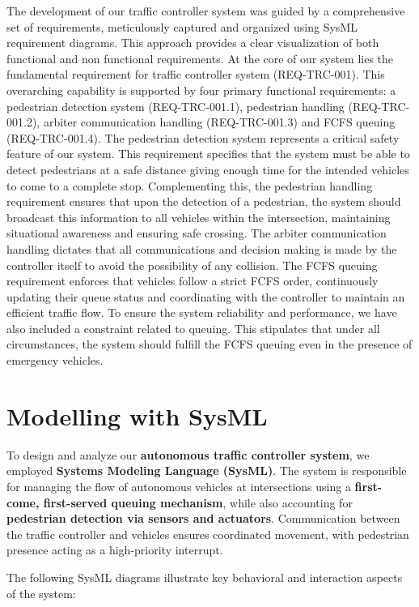 \documentclass[conference]{IEEEtran}
\begin{document}
The development of our traffic controller system was guided by a comprehensive set of requirements, meticulously captured and organized using SysML requirement diagrams. This approach provides a clear visualization of both functional and non functional requirements. At the core of our system lies the fundamental requirement for traffic controller system (REQ-TRC-001). This overarching capability is supported by four primary functional requirements: a pedestrian detection system (REQ-TRC-001.1), pedestrian handling (REQ-TRC-001.2), arbiter communication handling (REQ-TRC-001.3) and FCFS queuing (REQ-TRC-001.4). The pedestrian detection system represents a critical safety feature of our system. This requirement specifies that the system must be able to detect pedestrians at a safe distance giving enough time for the intended vehicles to come to a complete stop. Complementing this, the pedestrian handling requirement ensures that upon the detection of a pedestrian, the system should broadcast this information to all vehicles within the intersection, maintaining situational awareness and ensuring safe crossing. The arbiter communication handling dictates that all communications and decision making is made by the controller itself to avoid the possibility of any collision. The FCFS queuing requirement enforces that vehicles follow a strict FCFS order, continuously updating their queue status and coordinating with the controller to maintain an efficient traffic flow. To ensure the system reliability and performance, we have also included a constraint related to queuing. This stipulates that under all circumstances, the system should fulfill the FCFS queuing even in the presence of emergency vehicles.



\section{Modelling with SysML}
To design and analyze our \textbf{autonomous traffic controller system}, we employed \textbf{Systems Modeling Language (SysML)}. The system is responsible for managing the flow of autonomous vehicles at intersections using a \textbf{first-come, first-served queuing mechanism}, while also accounting for \textbf{pedestrian detection via sensors and actuators}. Communication between the traffic controller and vehicles ensures coordinated movement, with pedestrian presence acting as a high-priority interrupt.

The following SysML diagrams illustrate key behavioral and interaction aspects of the system:
\end{document}
